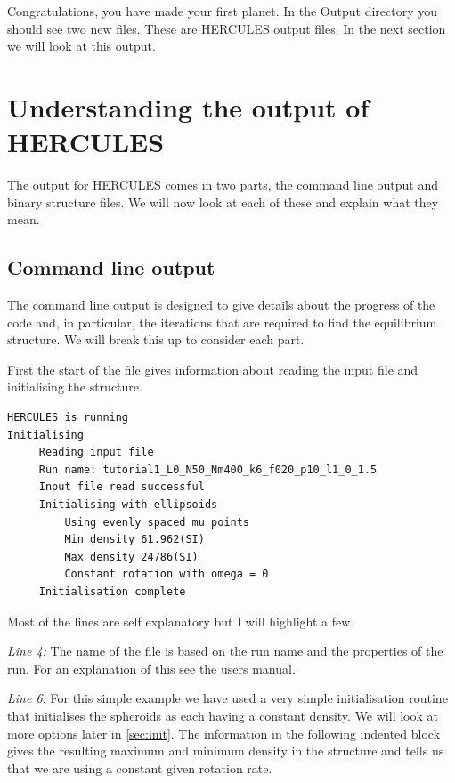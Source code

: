 \documentclass[11pt, oneside]{article}   	%
\begin{document}
Congratulations, you have made your first planet. In the Output directory you should see two new files. These are HERCULES output files. In the next section we will look at this output.

\section{Understanding the output of HERCULES}

The output for HERCULES comes in two parts, the command line output and binary structure files. We will now look at each of these and explain what they mean. 

\subsection{Command line output}
\label{sec:output}

The command line output is designed to give details about the progress of the code and, in particular, the iterations that are required to find the equilibrium structure. We will break this up to consider each part.

First the start of the file gives information about reading the input file and initialising the structure.

\begin{lstlisting}[language=TeX]
HERCULES is running
Initialising 
	 Reading input file 
	 Run name: tutorial1_L0_N50_Nm400_k6_f020_p10_l1_0_1.5
	 Input file read successful
	 Initialising with ellipsoids
	 	 Using evenly spaced mu points
	 	 Min density 61.962(SI)
	 	 Max density 24786(SI)
	 	 Constant rotation with omega = 0
	 Initialisation complete
\end{lstlisting}

Most of the lines are self explanatory but I will highlight a few.

\setlength{\parskip}{15pt}
\setlength{\leftskip}{1.5cm}
\setlength{\parindent}{-1.5cm}

{\it Line 4:} The name of the file is based on the run name and the properties of the run. For an explanation of this see the users manual.

{\it Line 6:} For this simple example we have used a very simple initialisation routine that initialises the spheroids as each having a constant density. We will look at more options later in \ref{sec:init}. The information in the following indented block gives the resulting maximum and minimum density in the structure and tells us that we are using a constant given rotation rate. \\
\end{document}
